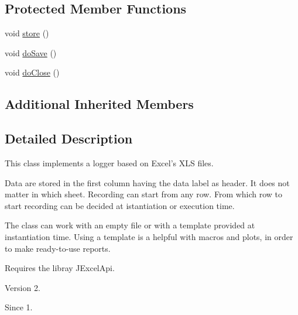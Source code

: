 \subsection*{Protected Member Functions}
\begin{DoxyCompactItemize}
\item 
void \hyperlink{classjenes_1_1utils_1_1_x_l_s_logger_ae6b3840ad6be8bdc558efaf6077d4ae4}{store} ()
\item 
void \hyperlink{classjenes_1_1utils_1_1_x_l_s_logger_a54c54393bf5a31442ebfc10517dfceea}{do\-Save} ()
\item 
void \hyperlink{classjenes_1_1utils_1_1_x_l_s_logger_acf58ddaa6873bcf626c9d24064a89b73}{do\-Close} ()
\end{DoxyCompactItemize}
\subsection*{Additional Inherited Members}


\subsection{Detailed Description}
This class implements a logger based on Excel's X\-L\-S files.

Data are stored in the first column having the data label as header. It does not matter in which sheet. Recording can start from any row. From which row to start recording can be decided at istantiation or execution time.

The class can work with an empty file or with a template provided at instantiation time. Using a template is a helpful with macros and plots, in order to make ready-\/to-\/use reports.

Requires the libray J\-Excel\-Api.

\begin{DoxyVersion}{Version}
2. 
\end{DoxyVersion}
\begin{DoxySince}{Since}
1. 
\end{DoxySince}



